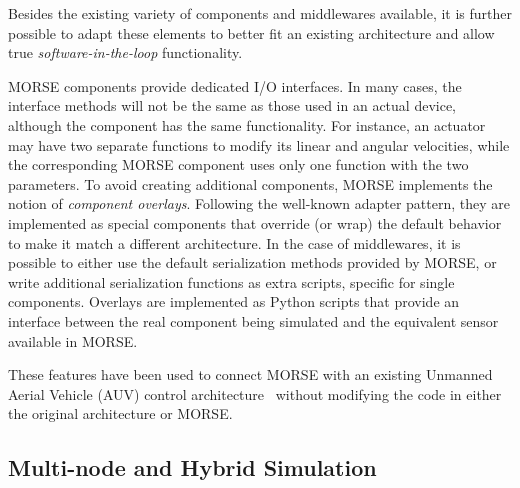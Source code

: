 \documentclass{llncs}
\begin{document}
Besides the existing variety of components and middlewares available, it is
further possible to adapt these elements to better fit an existing
architecture and allow true \emph{software-in-the-loop} functionality.

MORSE components provide dedicated I/O interfaces. In
many cases, the interface methods will not be the same as those used in an
actual device, although the component has the same functionality.
For instance, an actuator may have two separate functions to modify its linear
and angular velocities, while the corresponding MORSE component uses only one
function with the two parameters. To avoid creating additional components,
MORSE implements the notion of \emph{component overlays}. Following
the well-known adapter pattern, they are implemented as
special components that override (or wrap) the default
behavior to make it match a different architecture.
In the case of middlewares, it is possible to either use the default
serialization methods provided by MORSE, or write additional serialization
functions as extra scripts, specific for single components.
Overlays are implemented as Python scripts that provide an interface between
the real component being simulated and the equivalent sensor available in
MORSE.

These features have been used to connect MORSE with an existing
Unmanned Aerial Vehicle (AUV) control architecture~\cite{barbier2011}
without modifying the code in either the original architecture or MORSE.


\subsection{Multi-node and Hybrid Simulation}
\label{section:multinode}
\end{document}

